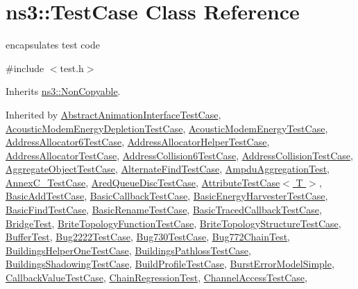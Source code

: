 \hypertarget{classns3_1_1TestCase}{}\section{ns3\+:\+:Test\+Case Class Reference}
\label{classns3_1_1TestCase}


encapsulates test code  




{\ttfamily \#include $<$test.\+h$>$}



Inherits \hyperlink{classns3_1_1NonCopyable}{ns3\+::\+Non\+Copyable}.



Inherited by \hyperlink{classAbstractAnimationInterfaceTestCase}{Abstract\+Animation\+Interface\+Test\+Case}, \hyperlink{classAcousticModemEnergyDepletionTestCase}{Acoustic\+Modem\+Energy\+Depletion\+Test\+Case}, \hyperlink{classAcousticModemEnergyTestCase}{Acoustic\+Modem\+Energy\+Test\+Case}, \hyperlink{classAddressAllocator6TestCase}{Address\+Allocator6\+Test\+Case}, \hyperlink{classAddressAllocatorHelperTestCase}{Address\+Allocator\+Helper\+Test\+Case}, \hyperlink{classAddressAllocatorTestCase}{Address\+Allocator\+Test\+Case}, \hyperlink{classAddressCollision6TestCase}{Address\+Collision6\+Test\+Case}, \hyperlink{classAddressCollisionTestCase}{Address\+Collision\+Test\+Case}, \hyperlink{classAggregateObjectTestCase}{Aggregate\+Object\+Test\+Case}, \hyperlink{classAlternateFindTestCase}{Alternate\+Find\+Test\+Case}, \hyperlink{classAmpduAggregationTest}{Ampdu\+Aggregation\+Test}, \hyperlink{classAnnexC__TestCase}{Annex\+C\+\_\+\+Test\+Case}, \hyperlink{classAredQueueDiscTestCase}{Ared\+Queue\+Disc\+Test\+Case}, \hyperlink{classAttributeTestCase}{Attribute\+Test\+Case$<$ T $>$}, \hyperlink{classBasicAddTestCase}{Basic\+Add\+Test\+Case}, \hyperlink{classBasicCallbackTestCase}{Basic\+Callback\+Test\+Case}, \hyperlink{classBasicEnergyHarvesterTestCase}{Basic\+Energy\+Harvester\+Test\+Case}, \hyperlink{classBasicFindTestCase}{Basic\+Find\+Test\+Case}, \hyperlink{classBasicRenameTestCase}{Basic\+Rename\+Test\+Case}, \hyperlink{classBasicTracedCallbackTestCase}{Basic\+Traced\+Callback\+Test\+Case}, \hyperlink{classBridgeTest}{Bridge\+Test}, \hyperlink{classBriteTopologyFunctionTestCase}{Brite\+Topology\+Function\+Test\+Case}, \hyperlink{classBriteTopologyStructureTestCase}{Brite\+Topology\+Structure\+Test\+Case}, \hyperlink{classBufferTest}{Buffer\+Test}, \hyperlink{classBug2222TestCase}{Bug2222\+Test\+Case}, \hyperlink{classBug730TestCase}{Bug730\+Test\+Case}, \hyperlink{classBug772ChainTest}{Bug772\+Chain\+Test}, \hyperlink{classBuildingsHelperOneTestCase}{Buildings\+Helper\+One\+Test\+Case}, \hyperlink{classBuildingsPathlossTestCase}{Buildings\+Pathloss\+Test\+Case}, \hyperlink{classBuildingsShadowingTestCase}{Buildings\+Shadowing\+Test\+Case}, \hyperlink{classBuildProfileTestCase}{Build\+Profile\+Test\+Case}, \hyperlink{classBurstErrorModelSimple}{Burst\+Error\+Model\+Simple}, \hyperlink{classCallbackValueTestCase}{Callback\+Value\+Test\+Case}, \hyperlink{classChainRegressionTest}{Chain\+Regression\+Test}, \hyperlink{classChannelAccessTestCase}{Channel\+Access\+Test\+Case}, 